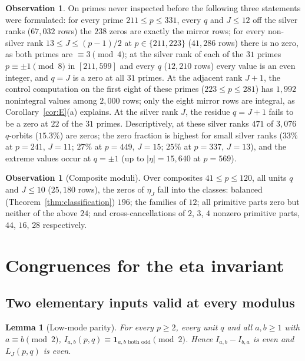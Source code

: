 \documentclass[11pt]{article}
\newtheorem{lemma}[theorem]{Lemma}
\theoremstyle{definition}
\newtheorem{observation}[theorem]{Observation}
\newcommand{\ind}{\mathbf 1}
\begin{document}
\begin{observation}
\label{obs:silver-blind}
On primes never inspected before the following three statements were
formulated: for every prime $211\leq p\leq331$, every $q$ and $J\leq12$
off the silver ranks ($67{,}032$ rows) the $238$ zeros are exactly the
mirror rows; for every non-silver rank $13\leq J\leq(p-1)/2$ at
$p\in\{211,223\}$ ($41{,}286$ rows) there is no zero, as both primes are
$\equiv3\pmod4$; at the silver rank of each of the $31$ primes
$p\equiv\pm1\pmod8$ in $[211,599]$ and every $q$ ($12{,}210$ rows) every
value is an even integer, and $q=J$ is a zero at all $31$ primes.  At the
adjacent rank $J+1$, the control computation on the first eight of these
primes ($223\leq p\leq281$) has $1{,}992$ nonintegral values among
$2{,}000$ rows; only the eight mirror rows are integral, as
Corollary~\ref{cor:E}(a) explains.  At the silver rank $J$, the residue
$q=J+1$ fails to be a zero at $22$ of the $31$ primes.  Descriptively, at
these silver ranks $471$ of $3{,}076$ $q$-orbits ($15.3\%$) are zeros; the
zero fraction is highest for small silver ranks ($33\%$ at $p=241$,
$J=11$; $27\%$ at $p=449$, $J=15$; $25\%$ at $p=337$, $J=13$), and the
extreme values occur at $q=\pm1$ (up to $|\eta|=15{,}640$ at $p=569$).
\end{observation}

\begin{observation}[Composite moduli]
\label{obs:composite}
Over composites $41\leq p\leq120$, all units $q$ and $J\leq10$
($25{,}180$ rows), the zeros of $\eta_J$ fall into the classes: balanced
(Theorem~\ref{thm:classification}) $196$; the families of
\cite[Thm.~7.1]{MahmoodP1Collection2026} $12$; all primitive parts zero
but neither of the above $24$; and cross-cancellations of $2$, $3$, $4$
nonzero primitive parts, $44$, $16$, $28$ respectively.
\end{observation}

\section{Congruences for the eta invariant}
\label{sec:congruences}

\subsection{Two elementary inputs valid at every modulus}

\begin{lemma}[Low-mode parity]
\label{lem:low-mode-parity}
For every $p\geq2$, every unit $q$ and all $a,b\geq1$ with
$a\equiv b\pmod2$,
$I_{a,b}(p,q)\equiv\ind_{a,b\text{ both odd}}\pmod2$.  Hence
$I_{a,b}-I_{b,a}$ is even and $L_J(p,q)$ is even.
\end{lemma}
\end{document}
